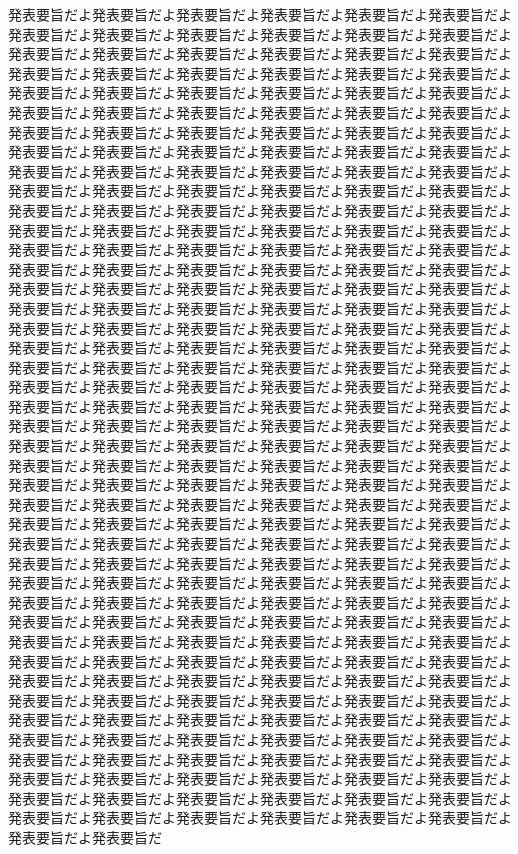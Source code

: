 \documentclass[uplatex]{jsarticle}
\begin{document}

\AbstractHeader

\begin{AbstractBody}
発表要旨だよ発表要旨だよ発表要旨だよ発表要旨だよ発表要旨だよ発表要旨だよ発表要旨だよ発表要旨だよ発表要旨だよ発表要旨だよ発表要旨だよ発表要旨だよ発表要旨だよ発表要旨だよ発表要旨だよ発表要旨だよ発表要旨だよ発表要旨だよ発表要旨だよ発表要旨だよ発表要旨だよ発表要旨だよ発表要旨だよ発表要旨だよ発表要旨だよ発表要旨だよ発表要旨だよ発表要旨だよ発表要旨だよ発表要旨だよ発表要旨だよ発表要旨だよ発表要旨だよ発表要旨だよ発表要旨だよ発表要旨だよ発表要旨だよ発表要旨だよ発表要旨だよ発表要旨だよ発表要旨だよ発表要旨だよ発表要旨だよ発表要旨だよ発表要旨だよ発表要旨だよ発表要旨だよ発表要旨だよ発表要旨だよ発表要旨だよ発表要旨だよ発表要旨だよ発表要旨だよ発表要旨だよ発表要旨だよ発表要旨だよ発表要旨だよ発表要旨だよ発表要旨だよ発表要旨だよ発表要旨だよ発表要旨だよ発表要旨だよ発表要旨だよ発表要旨だよ発表要旨だよ発表要旨だよ発表要旨だよ発表要旨だよ発表要旨だよ発表要旨だよ発表要旨だよ発表要旨だよ発表要旨だよ発表要旨だよ発表要旨だよ発表要旨だよ発表要旨だよ発表要旨だよ発表要旨だよ発表要旨だよ発表要旨だよ発表要旨だよ発表要旨だよ発表要旨だよ発表要旨だよ発表要旨だよ発表要旨だよ発表要旨だよ発表要旨だよ発表要旨だよ発表要旨だよ発表要旨だよ発表要旨だよ発表要旨だよ発表要旨だよ発表要旨だよ発表要旨だよ発表要旨だよ発表要旨だよ発表要旨だよ発表要旨だよ発表要旨だよ発表要旨だよ発表要旨だよ発表要旨だよ発表要旨だよ発表要旨だよ発表要旨だよ発表要旨だよ発表要旨だよ発表要旨だよ発表要旨だよ発表要旨だよ発表要旨だよ発表要旨だよ発表要旨だよ発表要旨だよ発表要旨だよ発表要旨だよ発表要旨だよ発表要旨だよ発表要旨だよ発表要旨だよ発表要旨だよ発表要旨だよ発表要旨だよ発表要旨だよ発表要旨だよ発表要旨だよ発表要旨だよ発表要旨だよ発表要旨だよ発表要旨だよ発表要旨だよ発表要旨だよ発表要旨だよ発表要旨だよ発表要旨だよ発表要旨だよ発表要旨だよ発表要旨だよ発表要旨だよ発表要旨だよ発表要旨だよ発表要旨だよ発表要旨だよ発表要旨だよ発表要旨だよ発表要旨だよ発表要旨だよ発表要旨だよ発表要旨だよ発表要旨だよ発表要旨だよ発表要旨だよ発表要旨だよ発表要旨だよ発表要旨だよ発表要旨だよ発表要旨だよ発表要旨だよ発表要旨だよ発表要旨だよ発表要旨だよ発表要旨だよ発表要旨だよ発表要旨だよ発表要旨だよ発表要旨だよ発表要旨だよ発表要旨だよ発表要旨だよ発表要旨だよ発表要旨だよ発表要旨だよ発表要旨だよ発表要旨だよ発表要旨だよ発表要旨だよ発表要旨だよ発表要旨だよ発表要旨だよ発表要旨だよ発表要旨だよ発表要旨だよ発表要旨だよ発表要旨だよ発表要旨だよ発表要旨だよ発表要旨だよ発表要旨だよ発表要旨だよ発表要旨だよ発表要旨だよ発表要旨だよ発表要旨だよ発表要旨だよ発表要旨だよ発表要旨だよ発表要旨だよ発表要旨だよ発表要旨だよ発表要旨だよ発表要旨だよ発表要旨だよ発表要旨だよ発表要旨だよ発表要旨だよ発表要旨だよ発表要旨だよ発表要旨だよ発表要旨だよ発表要旨だよ発表要旨だよ発表要旨だよ発表要旨だよ発表要旨だよ発表要旨だよ発表要旨だよ発表要旨だよ発表要旨だよ発表要旨だよ発表要旨だよ発表要旨だよ発表要旨だよ発表要旨だよ発表要旨だよ発表要旨だよ発表要旨だよ発表要旨だよ発表要旨だよ発表要旨だよ発表要旨だよ発表要旨だよ発表要旨だよ発表要旨だよ発表要旨だよ発表要旨だよ発表要旨だよ発表要旨だよ発表要旨だよ発表要旨だよ発表要旨だよ発表要旨だよ発表要旨だよ発表要旨だよ発表要旨だよ発表要旨だよ発表要旨だよ発表要旨だよ発表要旨だよ発表要旨だよ発表要旨だ
\end{AbstractBody}
\end{document}
